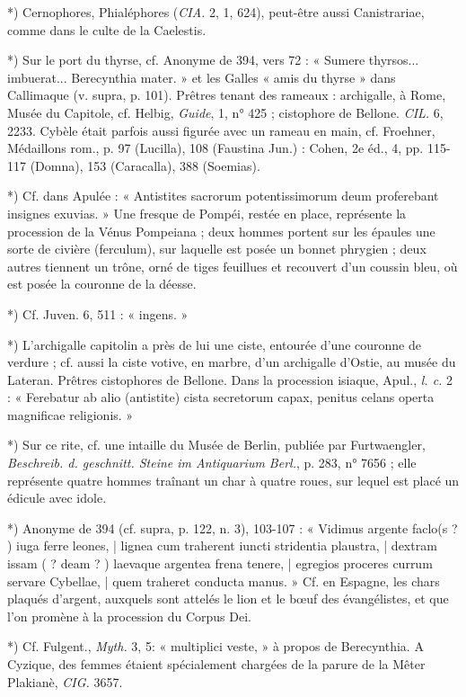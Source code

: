 \documentclass[a4paper, 11pt, oneside, polutonikogreek, french]{article}
\begin{document}
*) Cernophores, Phialéphores (\emph{CIA.} 2, 1, 624), peut-être aussi Canistrariae, comme dans le culte de la Caelestis.

*) Sur le port du thyrse, cf. Anonyme de 394, vers 72 : « Sumere thyrsos... imbuerat... Berecynthia mater. » et les Galles « amis du thyrse » dans Callimaque (v. supra, p. 101). Prêtres tenant des rameaux : archigalle, à Rome, Musée du Capitole, cf. Helbig, \emph{Guide}, 1, n° 425 ; cistophore de Bellone. \emph{CIL.} 6, 2233. Cybèle était parfois aussi figurée avec un rameau en main, cf. Froehner, Médaillons rom., p. 97 (Lucilla), 108 (Faustina Jun.) : Cohen, 2e éd., 4, pp. 115-117 (Domna), 153 (Caracalla), 388 (Soemias).

*) Cf. dans Apulée : « Antistites sacrorum potentissimorum deum proferebant insignes exuvias. » Une fresque de Pompéi, restée en place, représente la procession de la Vénus Pompeiana ; deux hommes portent sur les épaules une sorte de civière (ferculum), sur laquelle est posée un bonnet phrygien ; deux autres tiennent un trône, orné de tiges feuillues et recouvert d'un coussin bleu, où est posée la couronne de la déesse.

*) Cf. Juven. 6, 511 : « ingens. »

*) L'archigalle capitolin a près de lui une ciste, entourée d'une couronne de verdure ; cf. aussi la ciste votive, en marbre, d'un archigalle d'Ostie, au musée du Lateran. Prêtres cistophores de Bellone. Dans la procession isiaque, Apul., \emph{l. c.} 2 : « Ferebatur ab alio (antistite) cista secretorum capax, penitus celans operta magnificae religionis. »

*) Sur ce rite, cf. une intaille du Musée de Berlin, publiée par Furtwaengler, \emph{Beschreib. d. geschnitt. Steine im Antiquarium Berl.}, p. 283, n° 7656 ; elle représente quatre hommes traînant un char à quatre roues, sur lequel est placé un édicule avec idole.

*) Anonyme de 394 (cf. supra, p. 122, n. 3), 103-107 : « Vidimus argente faclo(s ? ) iuga ferre leones, | lignea cum traherent iuncti stridentia plaustra, | dextram issam ( ? deam ? ) laevaque argentea frena tenere, | egregios proceres currum servare Cybellae, | quem traheret conducta manus. » Cf. en Espagne, les chars plaqués d'argent, auxquels sont attelés le lion et le bœuf des évangélistes, et que l'on promène à la procession du Corpus Dei.

*) Cf. Fulgent., \emph{Myth.} 3, 5: « multiplici veste, » à propos de Berecynthia. A Cyzique, des femmes étaient spécialement chargées de la parure de la Mêter Plakianè, \emph{CIG.} 3657.
\end{document}
